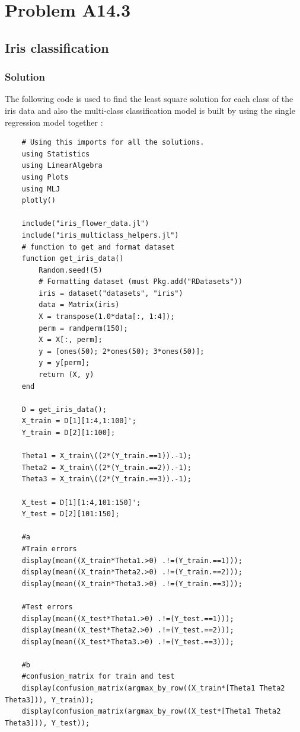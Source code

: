 \documentclass{article}
\begin{document}
\section*{Problem A14.3}
\subsection*{Iris classification}
\subsubsection*{Solution}
The following code is used to find the least square solution for each class of the iris data and also the multi-class classification model is built by using the single regression model together :
    \begin{verbatim}
    # Using this imports for all the solutions.
    using Statistics
    using LinearAlgebra
    using Plots
    using MLJ
    plotly()
    
    include("iris_flower_data.jl")
    include("iris_multiclass_helpers.jl")
    # function to get and format dataset 
    function get_iris_data()
        Random.seed!(5)
        # Formatting dataset (must Pkg.add("RDatasets"))
        iris = dataset("datasets", "iris")
        data = Matrix(iris)
        X = transpose(1.0*data[:, 1:4]);
        perm = randperm(150);
        X = X[:, perm]; 
        y = [ones(50); 2*ones(50); 3*ones(50)];
        y = y[perm];
        return (X, y)
    end
    
    D = get_iris_data();
    X_train = D[1][1:4,1:100]';
    Y_train = D[2][1:100];
    
    Theta1 = X_train\((2*(Y_train.==1)).-1); 
    Theta2 = X_train\((2*(Y_train.==2)).-1);
    Theta3 = X_train\((2*(Y_train.==3)).-1);
    
    X_test = D[1][1:4,101:150]';
    Y_test = D[2][101:150];
    
    #a
    #Train errors
    display(mean((X_train*Theta1.>0) .!=(Y_train.==1)));
    display(mean((X_train*Theta2.>0) .!=(Y_train.==2)));
    display(mean((X_train*Theta3.>0) .!=(Y_train.==3)));
    
    #Test errors
    display(mean((X_test*Theta1.>0) .!=(Y_test.==1)));
    display(mean((X_test*Theta2.>0) .!=(Y_test.==2)));
    display(mean((X_test*Theta3.>0) .!=(Y_test.==3)));
    
    #b 
    #confusion_matrix for train and test
    display(confusion_matrix(argmax_by_row((X_train*[Theta1 Theta2 Theta3])), Y_train));
    display(confusion_matrix(argmax_by_row((X_test*[Theta1 Theta2 Theta3])), Y_test));    

    \end{verbatim}
\end{document}
